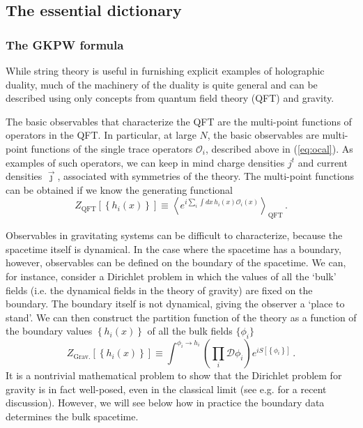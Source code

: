\documentclass[10pt, oneside]{book}
\def\be{\begin{equation}}
\def\ee{\end{equation}}
\def\ocal{{\mathcal{O}}}
\begin{document}
\begin{doublespace}
\subsection{The essential dictionary}
\label{sec:essential}

\subsubsection{The GKPW formula}

While string theory is useful in furnishing explicit examples of holographic duality, much of the machinery of the duality is quite general and can be described using only concepts from quantum field theory (QFT) and gravity.

The basic observables that characterize the QFT are the multi-point functions of operators in the QFT. In particular, at large $N$, the basic observables are multi-point functions of the single trace operators $\ocal_i$, described above in (\ref{eq:ocal}). As examples of such operators, we can keep in mind charge densities $j^t$ and current densities $\vec \jmath$, associated with symmetries of the theory. The multi-point functions can be obtained if we know the generating functional
\be\label{eq:ZQFT}
Z_\text{QFT}[\left\{h_i(x)\right\}] \equiv \left\langle e^{i \sum_i \int dx \, h_i(x) \ocal_i(x)} \right\rangle_\text{QFT} \,.
\ee

Observables in gravitating systems can be difficult to characterize, because the spacetime itself is dynamical. In the case where the spacetime has a boundary, however, observables can be defined on the boundary of the spacetime. We can, for instance, consider a Dirichlet problem in which the values of all the `bulk' fields (i.e. the dynamical fields in the theory of gravity) are fixed on the boundary. The boundary itself is not dynamical, giving the observer a `place to stand'. 
We can then construct the partition function of the theory as a function of the boundary values $\left\{h_i(x)\right\}$ of all the bulk fields $\{\phi_i\}$
\be\label{eq:gravity}
Z_\text{Grav.}[\left\{h_i(x)\right\}] \equiv \int^{\phi_i \to h_i} \left(\prod_i {\mathcal D}\phi_i \right) e^{i S[\left\{\phi_i\right\}]} \,.
\ee
It is a nontrivial mathematical problem to show that the Dirichlet problem for gravity is in fact well-posed, even in the classical limit (see e.g. \cite{Marolf:2012dr} for a recent discussion). However, we will see below how in practice the boundary data determines the bulk spacetime.


\end{doublespace}
\end{document}
